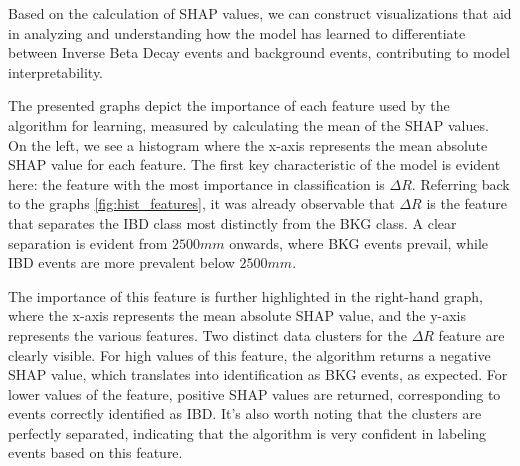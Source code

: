 Based on the calculation of SHAP values, we can construct visualizations that aid in analyzing and understanding how the model has learned to differentiate between Inverse Beta Decay events and background events, contributing to model interpretability. 

\begin{figure}[h!]
	\centering
	
	
\end{figure}


The presented graphs depict the importance of each feature used by the algorithm for learning, measured by calculating the mean of the SHAP values. On the left, we see a histogram where the x-axis represents the mean absolute SHAP value for each feature. The first key characteristic of the model is evident here: the feature with the most importance in classification is $\Delta R$. Referring back to the graphs \ref{fig:hist_features}, it was already observable that $\Delta R$ is the feature that separates the IBD class most distinctly from the BKG class. A clear separation is evident from $2500 mm$ onwards, where BKG events prevail, while IBD events are more prevalent below $2500 mm$. 

The importance of this feature is further highlighted in the right-hand graph, where the x-axis represents the mean absolute SHAP value, and the y-axis represents the various features. Two distinct data clusters for the $\Delta R$ feature are clearly visible. For high values of this feature, the algorithm returns a negative SHAP value, which translates into identification as BKG events, as expected. For lower values of the feature, positive SHAP values are returned, corresponding to events correctly identified as IBD. It's also worth noting that the clusters are perfectly separated, indicating that the algorithm is very confident in labeling events based on this feature.

